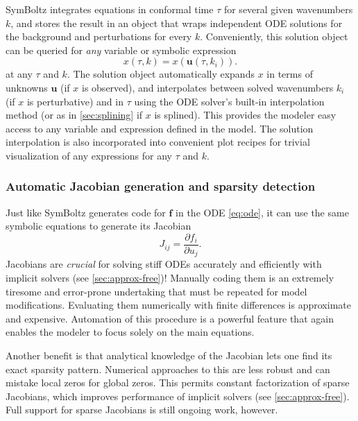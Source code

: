 \documentclass{aa}
\begin{document}
SymBoltz integrates equations in conformal time $\tau$ for several given wavenumbers $k$, and stores the result in an object that wraps independent ODE solutions for the background and perturbations for every $k$.
Conveniently, this solution object can be queried for \emph{any} variable or symbolic expression
\begin{equation}
    x(\tau, k) = x(\boldsymbol{u}(\tau, k_i)).
\end{equation}
at any $\tau$ and $k$.
The solution object automatically expands $x$ in terms of unknowns $\boldsymbol{u}$ (if $x$ is observed), and interpolates between solved wavenumbers $k_i$ (if $x$ is perturbative) and in $\tau$ using the ODE solver's built-in interpolation method (or as in \cref{sec:splining} if $x$ is splined).
This provides the modeler easy access to any variable and expression defined in the model.
The solution interpolation is also incorporated into convenient plot recipes for trivial visualization of any expressions for any $\tau$ and $k$.

\subsubsection{Automatic Jacobian generation and sparsity detection}
\label{sec:jacobian}

Just like SymBoltz generates code for $\boldsymbol{f}$ in the ODE \eqref{eq:ode}, it can use the same symbolic equations to generate its Jacobian
\begin{equation}
    J_{ij} = \frac{\partial f_i}{\partial u_j}.
\label{eq:jacobian}
\end{equation}
Jacobians are \emph{crucial} for solving stiff ODEs accurately and efficiently with implicit solvers (see \cref{sec:approx-free})!
Manually coding them is an extremely tiresome and error-prone undertaking that must be repeated for model modifications.
Evaluating them numerically with finite differences is approximate and expensive.
Automation of this procedure is a powerful feature that again enables the modeler to focus solely on the main equations.

Another benefit is that analytical knowledge of the Jacobian lets one find its exact sparsity pattern.
Numerical approaches to this are less robust and can mistake local zeros for global zeros.
This permits constant factorization of sparse Jacobians, which improves performance of implicit solvers (see \cref{sec:approx-free}).
Full support for sparse Jacobians is still ongoing work, however.
\end{document}
